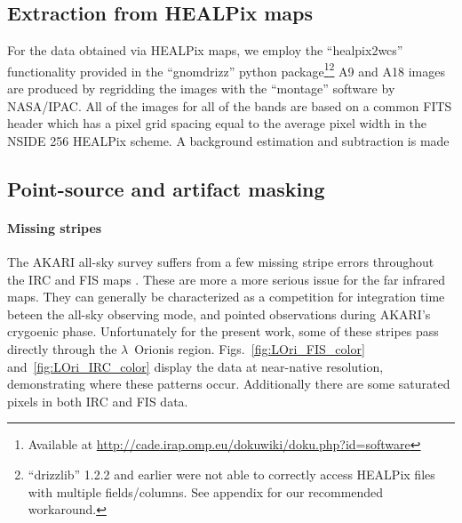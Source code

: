 		\subsection{Extraction from HEALPix maps}
		  For the data obtained via HEALPix maps, we employ the ``healpix2wcs'' functionality provided in the ``gnomdrizz'' python package\footnote{Available at \url{http://cade.irap.omp.eu/dokuwiki/doku.php?id=software}}\footnote{``drizzlib'' 1.2.2 and earlier were not able to correctly access HEALPix files with multiple fields/columns. See appendix for our recommended workaround.} A9 and A18 images are produced by regridding the images with the ``montage'' software by NASA/IPAC. All of the images for all of the bands are based on a common FITS header which has a pixel grid spacing equal to the average pixel width in the NSIDE 256 HEALPix scheme.
      A background estimation and subtraction is made

      \subsection{Point-source and artifact masking}
        \paragraph{Missing stripes}
          The AKARI all-sky survey suffers from a few missing stripe errors throughout the IRC and FIS maps \citep{ihshihara10, doi15}. These are more a more serious issue for the far infrared maps. They can generally be characterized as a competition for integration time beteen the all-sky observing mode, and pointed observations during AKARI's crygoenic phase. Unfortunately for the present work, some of these stripes pass directly through the $\lambda$~Orionis region. Figs.~\ref{fig:LOri_FIS_color} and~\ref{fig:LOri_IRC_color} display the data at near-native resolution, demonstrating where these patterns occur. Additionally there are some saturated pixels in both IRC and FIS data. 

